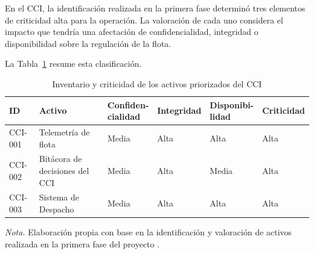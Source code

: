 En el CCI, la identificación realizada en la primera fase \parencite{fase1cci2026} determinó tres elementos de criticidad
alta para la operación. La valoración de cada uno considera el impacto que tendría una afectación de
confidencialidad, integridad o disponibilidad sobre la regulación de la flota.

La Tabla~\ref{tab:activos_criticos_blueprint} resume esta clasificación.

\begin{table}[H]
	\centering
	\caption{Inventario y criticidad de los activos priorizados del CCI}
	\label{tab:activos_criticos_blueprint}
	
	\small
	\setlength{\tabcolsep}{4pt}
	\renewcommand{\arraystretch}{1.15}
	
	\begin{tabularx}{\textwidth}{
			>{\raggedright\arraybackslash}p{1.5cm}
			>{\raggedright\arraybackslash}X
			>{\centering\arraybackslash}p{2.0cm}
			>{\centering\arraybackslash}p{1.9cm}
			>{\centering\arraybackslash}p{2.0cm}
			>{\centering\arraybackslash}p{1.9cm}}
		
		\toprule
		
		\textbf{ID} &
		\textbf{Activo} &
		\shortstack{\textbf{Confiden-}\\\textbf{cialidad}} &
		\textbf{Integridad} &
		\shortstack{\textbf{Disponibi-}\\\textbf{lidad}} &
		\textbf{Criticidad} \\
		
		\midrule
		
		CCI-001 &
		Telemetría de flota &
		Media &
		Alta &
		Alta &
		Alta \\
		
		CCI-002 &
		Bitácora de decisiones del CCI &
		Media &
		Alta &
		Media &
		Alta \\
		
		CCI-003 &
		Sistema de Despacho &
		Media &
		Alta &
		Alta &
		Alta \\
		
		\bottomrule
		
	\end{tabularx}
	
	\vspace{2pt}
	
	\begin{minipage}{0.96\textwidth}
		\footnotesize
		\textit{Nota.} Elaboración propia con base en la identificación y valoración de activos
		realizada en la primera fase del proyecto \parencite{fase1cci2026}.
	\end{minipage}
\end{table}

